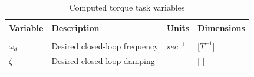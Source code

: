 \begin{table}[htb]
   \centering %
   \caption{Computed torque task variables} 
   \label{expVari}
   \begin{tabular}{p{1.5cm} p{2.2cm} p{0.8cm} p{1.5cm} }
   \hline \hline \noalign{\smallskip} \noalign{\smallskip} \noalign{\smallskip} \noalign{\smallskip}
   \textbf{Variable} & \textbf{Description} & \textbf{Units} & \textbf{Dimensions} \\ 
   \hline \hline \noalign{\smallskip} 
   \multicolumn{4}{c}{\textbf{Task parameters}}\\ \noalign{\smallskip}  \hline\hline  \noalign{\smallskip} 
   $\omega_d$ & Desired closed-loop frequency & $sec^{-1}$ & [$T^{-1}$]  \\ \noalign{\smallskip} \hline \noalign{\smallskip}
   $\zeta$ &  Desired closed-loop damping & $-$ & [ ]  \\ \noalign{\smallskip} \hline \noalign{\smallskip}
   \end{tabular}
\end{table}

